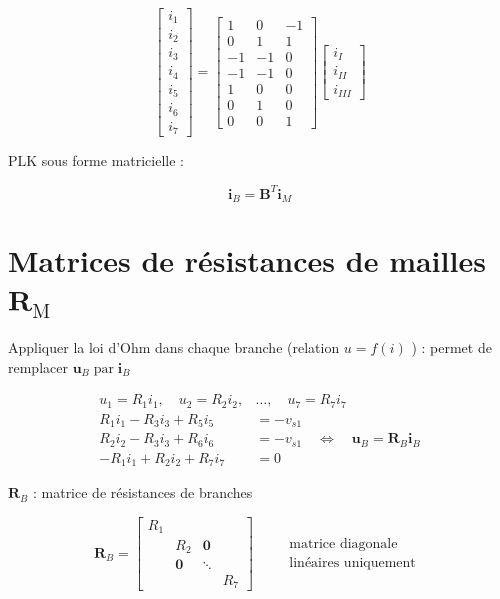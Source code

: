 \documentclass[10pt]{article}
\begin{document}
$$
\left[\begin{array}{l}
i_{1} \\
i_{2} \\
i_{3} \\
i_{4} \\
i_{5} \\
i_{6} \\
i_{7}
\end{array}\right]=\left[\begin{array}{rrr}
1 & 0 & -1 \\
0 & 1 & 1 \\
-1 & -1 & 0 \\
-1 & -1 & 0 \\
1 & 0 & 0 \\
0 & 1 & 0 \\
0 & 0 & 1
\end{array}\right]\left[\begin{array}{c}
i_{I} \\
i_{I I} \\
i_{I I I}
\end{array}\right]
$$

PLK sous forme matricielle :

$$
\mathbf{i}_{B}=\mathbf{B}^{T} \mathbf{i}_{M}
$$

\section*{Matrices de résistances de mailles $\mathbf{R}_{\mathrm{M}}$}
Appliquer la loi d'Ohm dans chaque branche (relation $u=f(i)$ ) : permet de remplacer $\mathbf{u}_{B} \operatorname{par} \mathbf{i}_{B}$

$$
\begin{aligned}
u_{1}=R_{1} i_{1}, \quad u_{2}=R_{2} i_{2}, & \ldots, \quad u_{7}=R_{7} i_{7} \\
R_{1} i_{1}-R_{3} i_{3}+R_{5} i_{5} & =-v_{s 1} \\
R_{2} i_{2}-R_{3} i_{3}+R_{6} i_{6} & =-v_{s 1} \quad \Longleftrightarrow \quad \mathbf{u}_{B}=\mathbf{R}_{B} \mathbf{i}_{B} \\
-R_{1} i_{1}+R_{2} i_{2}+R_{7} i_{7} & =0
\end{aligned}
$$

$\mathbf{R}_{B}$ : matrice de résistances de branches

$$
\mathbf{R}_{B}=\left[\begin{array}{cccc}
R_{1} & & & \\
& R_{2} & \mathbf{0} & \\
& \mathbf{0} & \ddots & \\
& & & R_{7}
\end{array}\right] \quad \begin{aligned}
& \text { matrice diagonale } \\
& \text { linéaires uniquement }
\end{aligned}
$$
\end{document}
